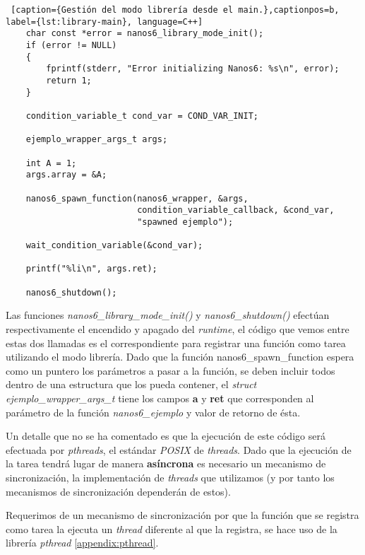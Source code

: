 \begin{minipage}{\linewidth}
\begin{lstlisting} [caption={Gestión del modo librería desde el main.},captionpos=b, label={lst:library-main}, language=C++]
    char const *error = nanos6_library_mode_init();
    if (error != NULL)
    {
        fprintf(stderr, "Error initializing Nanos6: %s\n", error);
        return 1;
    }

    condition_variable_t cond_var = COND_VAR_INIT;

    ejemplo_wrapper_args_t args;

    int A = 1;
    args.array = &A;
    
    nanos6_spawn_function(nanos6_wrapper, &args, 
    					  condition_variable_callback, &cond_var, 
    					  "spawned ejemplo");

    wait_condition_variable(&cond_var);

    printf("%li\n", args.ret);

    nanos6_shutdown();

\end{lstlisting}
\end{minipage}

Las funciones \textit{nanos6\_library\_mode\_init()} y \textit{nanos6\_shutdown()} efectúan respectivamente el encendido y apagado del \textit{runtime}, el código que vemos entre estas dos llamadas es el correspondiente para registrar una función como tarea utilizando el modo librería. Dado que la función nanos6\_spawn\_function espera como un puntero los parámetros a pasar a la función, se deben incluir todos dentro de una estructura que los pueda contener, el \textit{struct} \textit{ejemplo\_wrapper\_args\_t} tiene los campos \textbf{a} y \textbf{ret} que corresponden al parámetro de la función \textit{nanos6\_ejemplo} y valor de retorno de ésta.

\par\bigskip
Un detalle que no se ha comentado es que la ejecución de este código será efectuada por \textit{pthreads}, el estándar \textit{POSIX} de \textit{threads}. Dado que la ejecución de la tarea tendrá lugar de manera \textbf{asíncrona} es necesario un mecanismo de sincronización, la implementación de \textit{threads} que utilizamos (y por tanto los mecanismos de sincronización dependerán de estos).

\par\bigskip

Requerimos de un mecanismo de sincronización por que la función que se registra como tarea la ejecuta un \textit{thread} diferente al que la registra, se hace uso de la librería \textit{pthread} \ref{appendix:pthread}.
\par\bigskip

